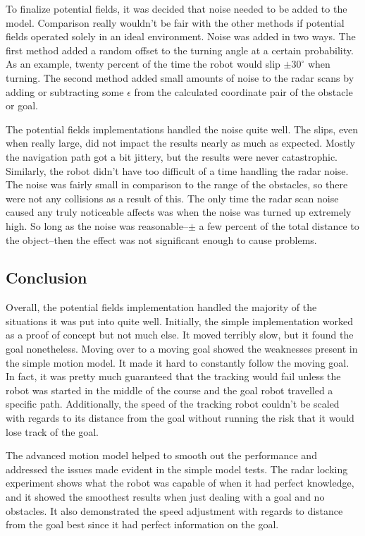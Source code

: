 \documentclass{aiaa-tc}%
\begin{document}
To finalize potential fields, it was decided that noise needed to be added to the model. Comparison really wouldn't be fair with the other methods if potential fields operated solely in an ideal environment. Noise was added in two ways. The first method added a random offset to the turning angle at a certain probability. As an example, twenty percent of the time the robot would slip $\pm 30^{\circ}$ when turning. The second method added small amounts of noise to the radar scans by adding or subtracting some $\epsilon$ from the calculated coordinate pair of the obstacle or goal.

The potential fields implementations handled the noise quite well. The slips, even when really large, did not impact the results nearly as much as expected. Mostly the navigation path got a bit jittery, but the results were never catastrophic. Similarly, the robot didn't have too difficult of a time handling the radar noise. The noise was fairly small in comparison to the range of the obstacles, so there were not any collisions as a result of this. The only time the radar scan noise caused any truly noticeable affects was when the noise was turned up extremely high. So long as the noise was reasonable--$\pm$ a few percent of the total distance to the object--then the effect was not significant enough to cause problems.

\subsection{Conclusion}
Overall, the potential fields implementation handled the majority of the situations it was put into quite well. Initially, the simple implementation worked as a proof of concept but not much else. It moved terribly slow, but it found the goal nonetheless. Moving over to a moving goal showed the weaknesses present in the simple motion model. It made it hard to constantly follow the moving goal. In fact, it was pretty much guaranteed that the tracking would fail unless the robot was started in the middle of the course and the goal robot travelled a specific path. Additionally, the speed of the tracking robot couldn't be scaled with regards to its distance from the goal without running the risk that it would lose track of the goal.

The advanced motion model helped to smooth out the performance and addressed the issues made evident in the simple model tests. The radar locking experiment shows what the robot was capable of when it had perfect knowledge, and it showed the smoothest results when just dealing with a goal and no obstacles. It also demonstrated the speed adjustment with regards to distance from the goal best since it had perfect information on the goal. 
\end{document}
